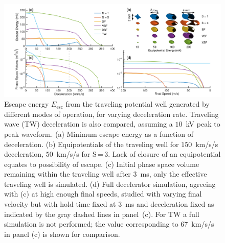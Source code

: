 \documentclass[%
 reprint,
 amsmath,amssymb,
 aps,
prl,
]{revtex4-1}
\begin{document}
\begin{figure}[ht!]
\includegraphics[trim=45 7 40 10, clip, width=\linewidth]{full-four-panel.png}%
\vspace{-5pt}
\caption{
Escape energy $E_\text{esc}$ from the traveling potential well generated by different modes of operation, for varying deceleration rate.
Traveling wave (TW) deceleration is also compared, assuming a $10$~kV peak to peak waveform. 
(a) Minimum escape energy as a function of deceleration. 
(b) Equipotentials of the traveling well for $150$~km/s/s deceleration, $50$~km/s/s for S\,=\,3. 
Lack of closure of an equipotential equates to possibility of escape. 
(c) Initial phase space volume remaining within the traveling well after $3$~ms, only the effective traveling well is simulated. 
(d) Full decelerator simulation, agreeing with (c) at high enough final speeds, studied with varying final velocity but with hold time fixed at $3$~ms and deceleration fixed as indicated by the gray dashed lines in panel~(c). 
For TW a full simulation is not performed; the value corresponding to $67$~km/s/s in panel (c) is shown for comparison.\vspace{-4mm}}
\label{fig:efftrap}
\end{figure}
\end{document}
